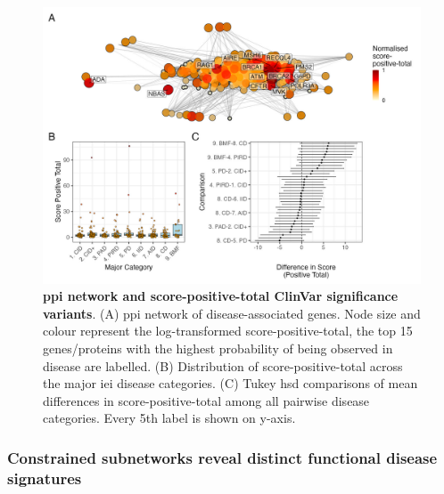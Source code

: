 \begin{figure}[h]
  \centering
  \includegraphics[width=\textwidth]{../images/untangleR_ppi_network_assoc_patch1.jpg}
  \caption{\textbf{\ac{ppi} network and score-positive-total ClinVar significance variants}.
    (A) \ac{ppi} network of disease-associated genes. Node size and colour represent the log-transformed score-positive-total, the top 15 genes/proteins with the highest probability of being observed in disease are labelled.
    (B) Distribution of score-positive-total across the major \ac{iei} disease categories.
    (C) Tukey \ac{hsd} comparisons of mean differences in score-positive-total among all pairwise disease categories. Every 5th label is shown on y-axis.
  }
  \label{fig:ppi_network_assoc}
\end{figure}

\clearpage

\subsubsection{Constrained subnetworks reveal distinct functional disease signatures}



